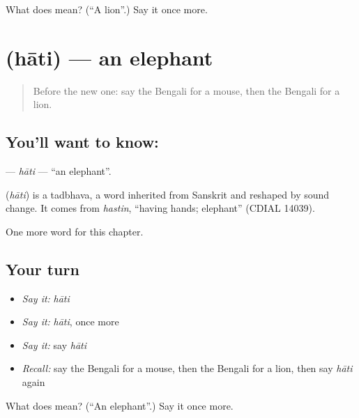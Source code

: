 \begin{tcolorbox}[breakable,colback=teal!4,colframe=teal!35!black,title={Before you move on}]
What does  mean? (\textquotedblleft{}A lion\textquotedblright{}.) Say it once more.
\end{tcolorbox}
\section[\texorpdfstring{\bn{হাতি} (hāti)}{হাতি (hāti)}]{ (hāti) — an elephant}

\label{lesson:BN-C70-hati}



\begin{quote}
Before the new one: say the Bengali for a mouse, then the Bengali for a lion.
\end{quote}

\subsection*{You'll want to know: }
\textbf{} — \emph{hāti} — \textquotedblleft{}an elephant\textquotedblright{}.

\begin{cousinweb}
\textbf{} (\emph{hāti}) is a tadbhava, a word inherited from Sanskrit and reshaped by sound change. It comes from \emph{hastin}, \textquotedblleft{}having hands; elephant\textquotedblright{} (CDIAL 14039).
\end{cousinweb}

\begin{grammarlens}[title={What you've built}]
One more word for this chapter.
\end{grammarlens}

\subsection*{Your turn}
\begin{itemize}
\raggedright
  \item \emph{Say it:} \emph{hāti}
  \item \emph{Say it:} \emph{hāti}, once more
  \item \emph{Say it:} say \emph{hāti}
  \item \emph{Recall:} say the Bengali for a mouse, then the Bengali for a lion, then say \emph{hāti} again
\end{itemize}

\begin{tcolorbox}[breakable,colback=teal!4,colframe=teal!35!black,title={Before you move on}]
What does  mean? (\textquotedblleft{}An elephant\textquotedblright{}.) Say it once more.
\end{tcolorbox}
